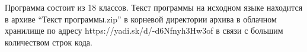 Программа состоит из 18 классов.
Текст программы на исходном языке находится в архиве “Текст
программы.zip” в корневой директории архива в облачном хранилище по
адресу https://yadi.sk/d/-d6Nfnyh3Hw3of в связи с большим количеством строк
кода.


